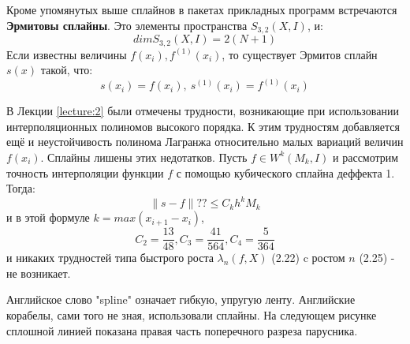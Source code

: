 Кроме упомянутых выше сплайнов в пакетах прикладных программ встречаются \textbf{Эрмитовы сплайны}. Это элементы пространства $S_{3,2}(X,I)$, и:
\begin{equation}
dim  S_{3,2}(X,I) = 2(N+1)
\end{equation}
Если известны величины $f(x_i),f^{(1)}(x_i)$, то существует Эрмитов сплайн $s(x)$ такой, что:
\begin{equation}
s(x_i)=f(x_i), \ s^{(1)}(x_i)=f^{(1)}(x_i)
\end{equation}

В Лекции \ref{lecture:2} были отмечены трудности, возникающие при использовании интерполяционных полиномов высокого порядка. К этим трудностям добавляется ещё и неустойчивость полинома Лагранжа относительно малых вариаций величин $f(x_i)$.
Сплайны лишены этих недотатков. Пусть $f\in W^k(M_k,I)$ и рассмотрим точность интерполяции функции $f$ с помощью кубического сплайна деффекта 1. Тогда:
\begin{equation}
\parallel s-f\parallel ?? \leq C_k h^k M_k
\end{equation}
и в этой формуле $k=max(x_{i+1}-x_i)$,
\begin{equation}
C_{2}=\dfrac{13}{48},C_{3}=\dfrac{41}{564},C_{4}=\dfrac{5}{364}
\end{equation}
и никаких трудностей типа быстрого роста $\lambda_n(f,X)$ (2.22) c ростом $n$ (2.25) - не возникает.

Английское слово "spline" означает гибкую, упругую ленту. Английские корабелы, сами того не зная, использовали сплайны. На следующем рисунке сплошной линией показана правая часть поперечного разреза парусника. 

